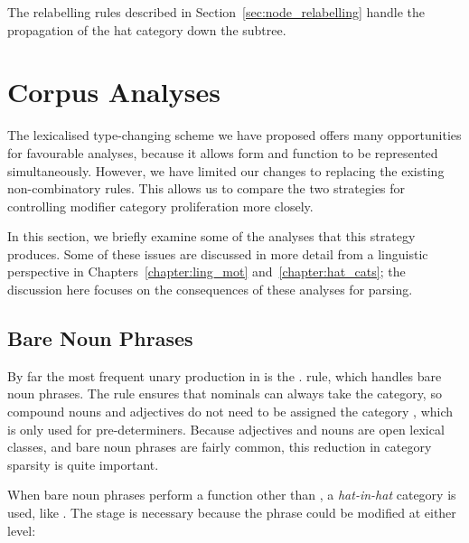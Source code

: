 The relabelling rules described in Section~\ref{sec:node_relabelling} handle the
propagation of the hat category down the subtree. 

\section{\hatsys Corpus Analyses}

The lexicalised type-changing scheme we have proposed offers many opportunities
for favourable analyses, because it allows form and function to be represented
simultaneously. However, we have limited our changes to replacing the existing
\ccgbank non-combinatory rules. This allows us to compare the two strategies for
controlling modifier category proliferation more closely.

In this section, we briefly examine some of the analyses that this strategy
produces. Some of these issues are discussed in more detail from a linguistic
perspective in Chapters~\ref{chapter:ling_mot} and~\ref{chapter:hat_cats}; the
discussion here focuses on the consequences of these analyses for parsing.

\subsection{Bare Noun Phrases}

By far the most frequent unary production in \ccgbank is the
. rule, which handles bare noun phrases. The rule
ensures that nominals can always take the  category, so compound nouns and
adjectives do not  need to be assigned the category , which is only
used for pre-determiners. Because adjectives and nouns are open lexical classes,
and bare noun phrases are fairly common, this reduction in category sparsity is
quite important.

When bare noun phrases perform a function other than , a
\emph{hat-in-hat} category is used, like . The  stage is
necessary because the phrase could be modified at either level:

\begin{center}
\ptbegtree
\ptbeg {}
\ptbeg {}
  \ptbeg {}
    \ptbeg {}
      \ptbeg {}
        \ptbeg {}  \ptend
        \ptbeg {}  \ptend
      \ptend
    \ptend
    \ptbeg {}
      \ptbeg {}  \ptend
      \ptbeg {} \ptbeg {} 
\ptend \ptend
    \ptend
  \ptend
\ptend
\ptbeg {} 
\ptend
\ptend
\ptendtree
\end{center}

